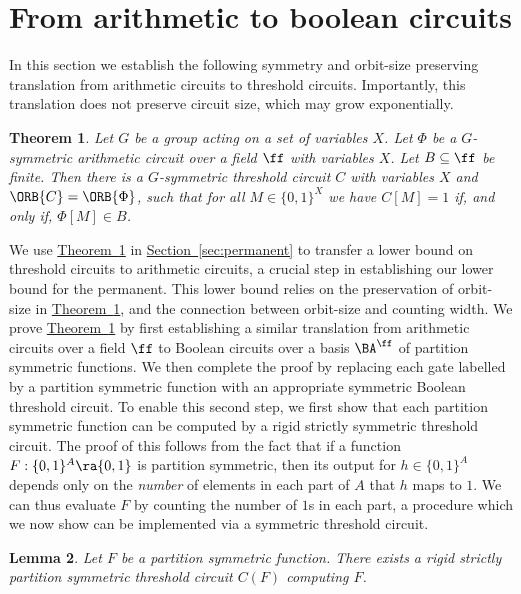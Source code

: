 \documentclass[11pt]{article}
\newcommand{\expref}[2]{\texorpdfstring{\hyperref[#2]{#1~\ref{#2}}}{#1~\ref{#2}}}
\newtheorem{theorem}{Theorem}[section]
\newtheorem{lemma}[theorem]{Lemma}
\begin{document}
\section{From arithmetic to boolean circuits}\label{sec:formulas-to-circuits}
In this section we establish the following symmetry and orbit-size preserving translation from
arithmetic circuits to threshold circuits. Importantly, this translation does not preserve circuit size, which may grow exponentially.
\begin{theorem}
  Let $G$ be a group acting on a set of variables $X$. Let $\Phi$ be a
  $G$-symmetric arithmetic circuit over a field $\ff$ with variables $X$. Let $B
  \subseteq \ff$ be finite. Then there is a $G$-symmetric threshold circuit $C$
  with variables $X$ and $\ORB{C} = \ORB{\Phi}$, such that for all $M \in \{0, 1\}^X$ we have $C[M] = 1$
  if, and only if, $\Phi[M] \in B$.
  \label{thm:arithmetic-to-boolean}
\end{theorem}
We use \expref{Theorem}{thm:arithmetic-to-boolean} in \expref{Section}{sec:permanent} to
transfer a lower bound on threshold circuits to arithmetic circuits, a crucial
step in establishing our lower bound for the permanent. This lower bound relies on the preservation of orbit-size in \expref{Theorem}{thm:arithmetic-to-boolean}, and the connection between orbit-size and counting width.
We prove \expref{Theorem}{thm:arithmetic-to-boolean} by first establishing a similar
translation from arithmetic circuits over a field $\ff$ to Boolean circuits over
a basis $\BA^{\ff}$ 
of partition symmetric functions. We then complete the proof
by replacing each gate labelled by a partition symmetric function with an
appropriate symmetric Boolean threshold circuit.
To enable this second step, we first show that each partition symmetric function
can be computed by a rigid strictly symmetric threshold circuit. The proof of
this follows from the fact that if a function $F: \{0, 1\}^A \ra \{0, 1\}$ is
partition symmetric, then its output for $h \in \{0, 1\}^A$ depends only on the
\emph{number} of elements in each part of $A$ that $h$ maps to $1$. We can thus
evaluate $F$ by counting the number of $1$s in each part, a procedure which we
now show can be implemented via a symmetric threshold circuit.
\begin{lemma}
  Let $F$ be a partition symmetric function. There exists a rigid strictly
  partition symmetric threshold circuit $C(F)$ computing $F$.
  \label{lem:partition-symmetric}
\end{lemma}
\end{document}
